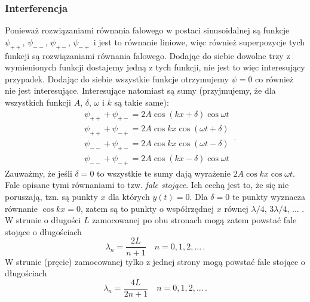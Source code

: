 \documentclass[../main.tex]{subfiles}
\begin{document}
        \subsubsection{Interferencja}
        Ponieważ rozwiązaniami równania falowego w postaci sinusoidalnej są funkcje \(\psi_{++}\), \(\psi_{--}\), \(\psi_{+-}\), \(\psi_{-+}\) i jest to równanie liniowe, więc również superpozycje tych funkcji są rozwiązaniami równania falowego. Dodając do siebie dowolne trzy z wymienionych funkcji dostajemy jedną z tych funkcji, nie jest to więc interesujący przypadek. Dodając do siebie wszystkie funkcje otrzymujemy \(\psi=0\) co również nie jest interesujące. Interesujące natomiast są sumy (przyjmujemy, że dla wszystkich funkcji \(A\), \(\delta\), \(\omega\) i \(k\) są takie same):
        \begin{equation*}
        \begin{split}
            &\psi_{++}+\psi_{+-}=2A\cos\left(kx+\delta\right)\cos\omega t\\
            &\psi_{++}+\psi_{-+}=2A\cos kx\cos\left(\omega t+\delta\right)\\
            &\psi_{--}+\psi_{+-}=2A\cos kx\cos(\omega t-\delta)\\
            &\psi_{--}+\psi_{-+}=2A\cos(kx-\delta)\cos\omega t
        \end{split}\,.
        \end{equation*}
        Zauważmy, że jeśli \(\delta=0\) to wszystkie te sumy dają wyrażenie \(2A\cos kx\cos\omega t\). Fale opisane tymi równaniami to tzw. \textit{fale stojące}. Ich cechą jest to, że się nie poruszają, tzn. są punkty \(x\) dla których \(y(t)=0\). Dla \(\delta=0\) te punkty wyznacza równanie \(\cos kx=0\), zatem są to punkty o współrzędnej \(x\) równej \(\lambda/4\), \(3\lambda/4\), ... . W strunie o długości \(L\) zamocowanej po obu stronach mogą zatem powstać fale stojące o długościach
        \begin{equation*}
            \lambda_n =\frac{2L}{n+1}\quad n=0,1,2,...\,.
        \end{equation*}
        W strunie (pręcie) zamocowanej tylko z jednej strony mogą powstać fale stojące o długościach
        \begin{equation*}
            \lambda_n=\frac{4L}{2n+1}\quad n=0,1,2,...\,.
        \end{equation*}
\end{document}

